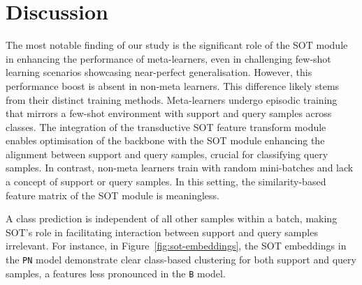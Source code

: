 \section{Discussion}

The most notable finding of our study is the significant role of the SOT module in enhancing the performance of meta-learners, even in challenging few-shot learning scenarios showcasing near-perfect generalisation. However, this performance boost is absent in non-meta learners. This difference likely stems from their distinct training methods. Meta-learners undergo episodic training that mirrors a few-shot environment with support and query samples across classes. The integration of the transductive SOT feature transform module enables optimisation of the backbone with the SOT module enhancing the alignment between support and query samples, crucial for classifying query samples. In contrast, non-meta learners train with random mini-batches and lack a concept of support or query samples. In this setting, the similarity-based feature matrix of the SOT module is meaningless.





A class prediction is independent of all other samples within a batch, making SOT's role in facilitating interaction between support and query samples irrelevant. For instance, in Figure~\ref{fig:sot-embeddings}, the SOT embeddings in the \texttt{PN} model demonstrate clear class-based clustering for both support and query samples, a features less pronounced in the \texttt{B} model.

